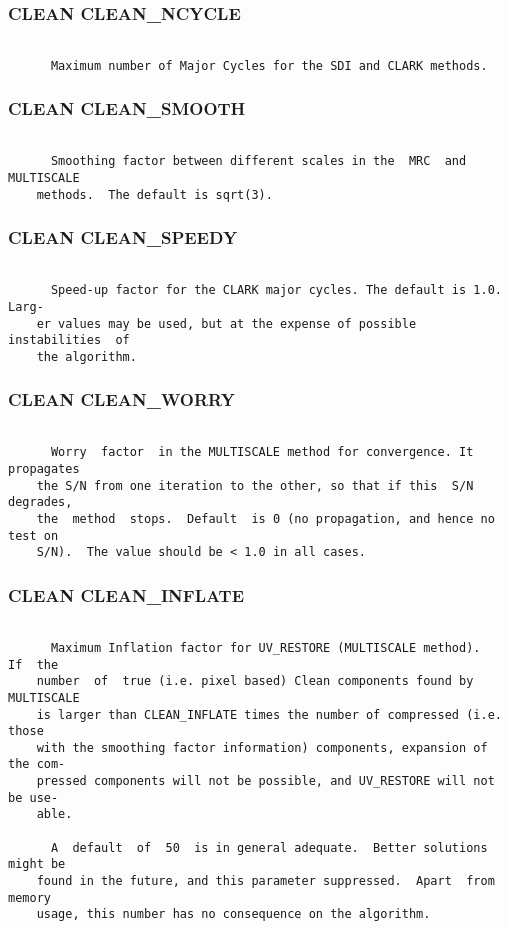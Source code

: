 \subsubsection{CLEAN CLEAN\_NCYCLE}
\begin{verbatim}

      Maximum number of Major Cycles for the SDI and CLARK methods.

\end{verbatim}
\subsubsection{CLEAN CLEAN\_SMOOTH}
\begin{verbatim}

      Smoothing factor between different scales in the  MRC  and  MULTISCALE
    methods.  The default is sqrt(3).

\end{verbatim}
\subsubsection{CLEAN CLEAN\_SPEEDY}
\begin{verbatim}

      Speed-up factor for the CLARK major cycles. The default is 1.0.  Larg-
    er values may be used, but at the expense of possible  instabilities  of
    the algorithm.

\end{verbatim}
\subsubsection{CLEAN CLEAN\_WORRY}
\begin{verbatim}

      Worry  factor  in the MULTISCALE method for convergence. It propagates
    the S/N from one iteration to the other, so that if this  S/N  degrades,
    the  method  stops.  Default  is 0 (no propagation, and hence no test on
    S/N).  The value should be < 1.0 in all cases.

\end{verbatim}
\subsubsection{CLEAN CLEAN\_INFLATE}
\begin{verbatim}

      Maximum Inflation factor for UV_RESTORE (MULTISCALE method).   If  the
    number  of  true (i.e. pixel based) Clean components found by MULTISCALE
    is larger than CLEAN_INFLATE times the number of compressed (i.e.  those
    with the smoothing factor information) components, expansion of the com-
    pressed components will not be possible, and UV_RESTORE will not be use-
    able.

      A  default  of  50  is in general adequate.  Better solutions might be
    found in the future, and this parameter suppressed.  Apart  from  memory
    usage, this number has no consequence on the algorithm.

\end{verbatim}
